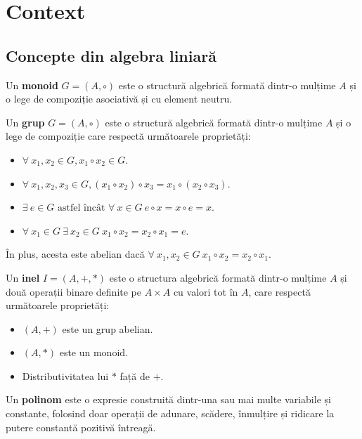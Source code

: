 \chapter{Context}

\section{Concepte din algebra liniară}

\begin{defn}
  Un \textbf{monoid} $G = (A, \circ)$ este o structură algebrică formată dintr-o
  mulțime $A$ și o lege de compoziție asociativă și cu element neutru.
\end{defn}

\begin{defn}
  Un \textbf{grup} $G = (A, \circ)$ este o structură algebrică formată dintr-o
  mulțime $A$ și o lege de compoziție care respectă următoarele proprietăți:
  \begin{itemize}
      \item{$\forall\ x_{1}, x_{2} \in G, x_{1} \circ x_{2} \in G$.}
      \item{$\forall\ x_{1}, x_{2}, x_{3} \in G, (x_{1} \circ x_{2}) \circ x_{3} = x_{1} \circ (x_{2} \circ x_{3})$.}
      \item{$\exists\ e \in G \text{ astfel
      încât } \forall\ x \in G\ e \circ x = x \circ e = x$.}
      \item{$\forall\ x_{1} \in G\ \exists\ x_{2} \in G \ x_{1} \circ x_{2} = x_{2} \circ x_{1} = e$.}
  \end{itemize}
  În plus, acesta este abelian dacă
  $\forall\ x_{1}, x_{2} \in G\ x_{1} \circ x_{2} = x_{2} \circ x_{1}$.
\end{defn}

\begin{defn}
  Un \textbf{inel} $I = (A, +, *)$ este o structura algebrică formată dintr-o
  mulțime $A$ și două operații binare definite pe $A \times A$ cu valori tot în
  $A$, care respectă următoarele proprietăți:
  \begin{itemize}
      \item{$(A, +)$ este un grup abelian.}
      \item{$(A, *)$ este un monoid.}
      \item{Distributivitatea lui $*$ față de $+$.}
  \end{itemize}
\end{defn}

\begin{defn}
  Un \textbf{polinom} este o expresie construită dintr-una sau mai multe
  variabile și constante, folosind doar operații de adunare, scădere, înmulțire
  și ridicare la putere constantă pozitivă întreagă.
\end{defn}

